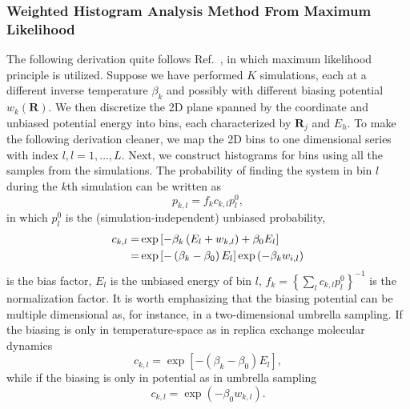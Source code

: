\subsubsection{Weighted Histogram Analysis Method From Maximum Likelihood}
The following derivation quite follows Ref.~\cite{GallicchioJPCB2005}, in which maximum likelihood principle is utilized. 
Suppose we have performed $K$ simulations, each at a different inverse temperature $\beta_k$ and possibly with different biasing potential $w_k(\mathbf{R})$.
We then discretize the 2D plane spanned by the coordinate and unbiased potential energy into bins, each characterized by ${\mathbf{R}_j}$ and ${E_h}$. To make the following derivation cleaner, we map the 2D bins to one dimensional series with index $l, l=1,\dots,L$. Next, we construct histograms for bins using all the samples from the simulations. The probability of finding the system in bin $l$ during the $k$th simulation can be written as
\begin{equation}
p_{k,l}=f_kc_{k,l}p_l^0,
\end{equation}
in which $p_l^0$ is the (simulation-independent) unbiased probability,
\begin{align}
c_{k,l}=&\exp{\left[-\beta_k\left(E_l+w_{k,l}\right)+\beta_0E_l\right]}\notag\\
=&\exp{\left[-\left(\beta_k-\beta_0\right)E_l\right]}\exp{\left(-\beta_kw_{i,l}\right)}
\end{align}
is the bias factor, $E_l$ is the unbiased energy of bin $l$, $f_k={\left\{\sum\limits_lc_{k,l}p_l^0\right\}}^{-1}$ is the normalization factor.
It is worth emphasizing that the biasing potential can be multiple dimensional as, for instance, in a two-dimensional umbrella sampling.
If the biasing is only in temperature-space as in replica exchange molecular dynamics
\begin{equation}
c_{k,l}=\exp{\left[-\left(\beta_k-\beta_0\right)E_l\right]},
\end{equation} 
while if the biasing is only in potential as in umbrella sampling
\begin{equation}
c_{k,l}=\exp{\left(-\beta_0w_{k,l}\right)}.
\end{equation}

